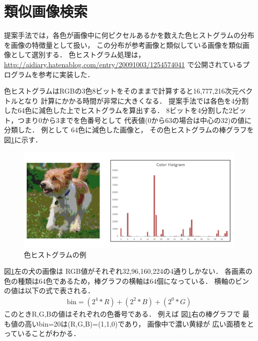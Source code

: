 \documentclass{deimj}
\begin{document}
\section{類似画像検索}
\label{sec:similar}

提案手法では，各色が画像中に何ピクセルあるかを数えた色ヒストグラムの分布を画像の特徴量として扱い，
この分布が参考画像と類似している画像を類似画像として選別する．
色ヒストグラム処理は，
\url{http://aidiary.hatenablog.com/entry/20091003/1254574041}
で公開されているプログラムを参考に実装した．

色ヒストグラムはRGBの3色8ビットをそのままで計算すると16,777,216次元ベクトルとなり
計算にかかる時間が非常に大きくなる．
提案手法では各色を4分割した64色に減色した上でヒストグラムを算出する．
8ビットを4分割した2ビット，つまり0から3までを色番号として
代表値(0から63の場合は中心の32)の値に分類した．
例として
64色に減色した画像と，
その色ヒストグラムの棒グラフを
図\ref{fig:color}に示す．
%
\begin{figure}[tb]
 \begin{center}
  \includegraphics[scale=0.50]{colorhist.jpg}
 \end{center}
 \caption{色ヒストグラムの例}
 \label{fig:color}
\end{figure}
%
%
図\ref{fig:color}左の犬の画像は
RGB値がそれぞれ32,96,160,224の4通りしかない．
各画素の色の種類は64色であるため，棒グラフの横軸は64個になっている．
横軸のビンの値は以下の式で表される．
\begin{eqnarray}
\mbox{bin} = (2^4 * R) + (2^2 * B) + (2^0 * G)
\end{eqnarray}
このときR,G,Bの値はそれぞれの色番号である．
例えば
図\ref{fig:color}右の棒グラフで
最も値の高いbin=20は(R,G,B)=(1,1,0)であり，
画像中で濃い黄緑が
広い面積をとっていることがわかる．
\end{document}
